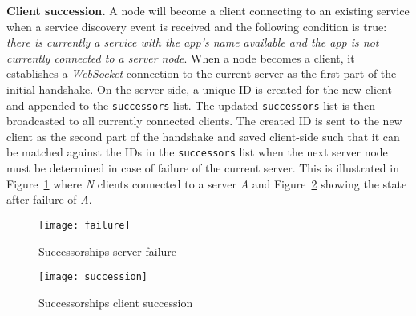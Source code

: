 \noindent\textbf{Client succession.}
A \APIshort node will become a client connecting to an existing service when a service discovery event is received and the following condition is true: \textit{there is currently a \APIshort service with the app's name available and the app is not currently connected to a server node}. 
When a node becomes a client, it establishes a \textit{WebSocket} connection to the current server as the first part of the initial handshake. 
On the server side, a unique ID is created for the new client and appended to the \texttt{successors} list. The updated \texttt{successors} list is then broadcasted to all currently connected clients. 
The created ID is sent to the new client as the second part of the handshake and saved client-side such that it can be matched against the IDs in the \texttt{successors} list when the next server node must be determined in case of failure of the current server. 
This is illustrated in Figure~\ref{fig:failure} where \textit{N} clients connected to a server \textit{A} and Figure~\ref{fig:succession} showing the state after failure of \textit{A}.

\begin{figure}[h]
    \centering
    \texttt{[image: failure]}
    \caption{Successorships server failure}
    \label{fig:failure}
\end{figure}

\begin{figure}[h]
    \centering
    \texttt{[image: succession]}
    \caption{Successorships client succession}
    \label{fig:succession}
\end{figure}

